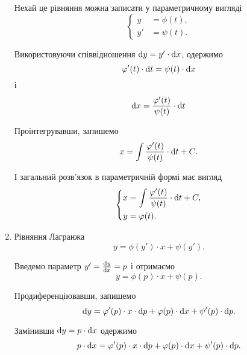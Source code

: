 \begin{enumerate}
	Нехай це рівняння можна записати у параметричному вигляді
	\begin{equation*}
		\left\{
			\begin{aligned}
				y &= \phi(t), \\
				y' &= \psi(t).
			\end{aligned}
		\right.
	\end{equation*}
	
	Використовуючи співвідношення $\mathop{}\!\mathrm{d} y = y ' \cdot \mathop{}\!\mathrm{d} x$, одержимо 
	\begin{equation*}
		\varphi'(t) \cdot \mathop{}\!\mathrm{d} t = \psi(t) \cdot \mathop{}\!\mathrm{d} x
	\end{equation*}
	і
	\begin{equation*}
		\mathop{}\!\mathrm{d} x = \frac{\varphi'(t)}{\psi(t)} \cdot \mathop{}\!\mathrm{d} t
	\end{equation*}
	
	Проінтегрувавши, запишемо
	\begin{equation*}
		x = \int \frac{\varphi'(t)}{\psi(t)}\cdot \mathop{}\!\mathrm{d} t + C.
	\end{equation*}
	
	І загальний розв'язок в параметричній формі має вигляд
	\begin{equation*}
		\left\{
			\begin{aligned}
				x &= \int \frac{\varphi'(t)}{\psi(t)}\cdot \mathop{}\!\mathrm{d} t + C, \\
				y &= \varphi(t).
			\end{aligned}
		\right.
	\end{equation*}
	
	\item Рівняння Лагранжа
	\begin{equation*}
		y = \phi(y') \cdot x + \psi(y').
	\end{equation*}
	
	Введемо параметр $y' = \frac{\mathop{}\!\mathrm{d} y}{\mathop{}\!\mathrm{d} x} = p$ і отримаємо
	\begin{equation*}
		y = \phi(p) \cdot x + \psi(p).
	\end{equation*}
	
	Продиференціювавши, запишемо
	\begin{equation*}
		\mathop{}\!\mathrm{d} y = \varphi'(p) \cdot x \cdot \mathop{}\!\mathrm{d} p + \varphi(p) \cdot \mathop{}\!\mathrm{d} x + \psi'(p) \cdot \mathop{}\!\mathrm{d} p.
	\end{equation*}
	
	Замінивши $\mathop{}\!\mathrm{d} y = p \cdot \mathop{}\!\mathrm{d} x$ одержимо
	\begin{equation*}
		p \cdot \mathop{}\!\mathrm{d} x = \varphi'(p) \cdot x \cdot \mathop{}\!\mathrm{d} p + \varphi(p) \cdot \mathop{}\!\mathrm{d} x + \psi'(p) \cdot \mathop{}\!\mathrm{d} p.
	\end{equation*}
	

\end{enumerate}
